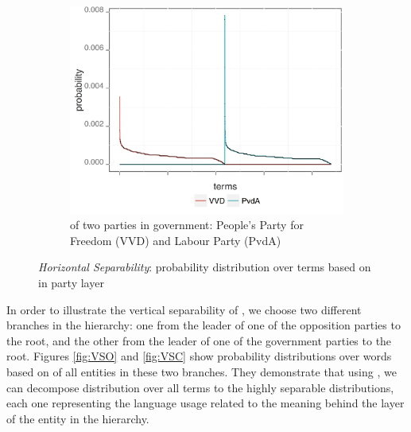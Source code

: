 \begin{figure}[!t]
\begin{subfigure}[b]{0.32\textwidth}
        \end{subfigure}
        ~ 
        \begin{subfigure}[b]{0.32\textwidth}
\centering
\includegraphics[width=\linewidth]{02-part-01/chapter-03/figs_and_tables/img_VVD-PvdA.png}
\caption{\label{fig:HSPCC} \achswlm of two parties in government: People's Party for Freedom (VVD) and Labour Party (PvdA)}
        \end{subfigure}
        
        \caption{\label{fig:HSP-pairs} \emph{Horizontal Separability}: probability distribution over terms based on \hswlms in party layer}
\end{figure}

In order to illustrate the vertical separability of \achswlm, we choose two different branches in the hierarchy: one from the leader of one of the opposition parties to the root, and the other from the leader of one of the government parties to the root. Figures \ref{fig:VSO} and \ref{fig:VSC} show probability distributions over words based on \achswlm of all entities in these two branches. They demonstrate that using \achswlm, we can decompose distribution over all terms to the highly separable distributions, each one representing the language usage related to the meaning behind the layer of the entity in the hierarchy. 

